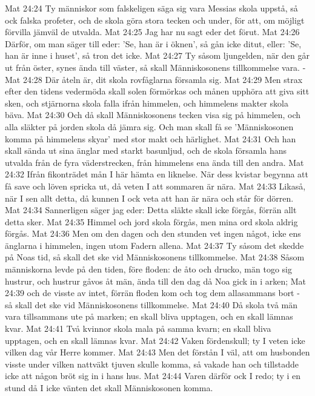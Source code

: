 Mat 24:24  Ty människor som falskeligen säga sig vara Messias skola uppstå, så ock falska profeter, och de skola göra stora tecken och under, för att, om möjligt förvilla jämväl de utvalda.
Mat 24:25  Jag har nu sagt eder det förut.
Mat 24:26  Därför, om man säger till eder: 'Se, han är i öknen', så gån icke ditut, eller: 'Se, han är inne i huset', så tron det icke.
Mat 24:27  Ty såsom ljungelden, när den går ut från öster, synes ända till väster, så skall Människosonens tillkommelse vara. -
Mat 24:28  Där åteln är, dit skola rovfåglarna församla sig.
Mat 24:29  Men strax efter den tidens vedermöda skall solen förmörkas och månen upphöra att giva sitt sken, och stjärnorna skola falla ifrån himmelen, och himmelens makter skola bäva.
Mat 24:30  Och då skall Människosonens tecken visa sig på himmelen, och alla släkter på jorden skola då jämra sig. Och man skall få se 'Människosonen komma på himmelens skyar' med stor makt och härlighet.
Mat 24:31  Och han skall sända ut sina änglar med starkt basunljud, och de skola församla hans utvalda från de fyra väderstrecken, från himmelens ena ända till den andra.
Mat 24:32  Ifrån fikonträdet mån I här hämta en liknelse. När dess kvistar begynna att få save och löven spricka ut, då veten I att sommaren är nära.
Mat 24:33  Likaså, när I sen allt detta, då kunnen I ock veta att han är nära och står för dörren.
Mat 24:34  Sannerligen säger jag eder: Detta släkte skall icke förgås, förrän allt detta sker.
Mat 24:35  Himmel och jord skola förgås, men mina ord skola aldrig förgås.
Mat 24:36  Men om den dagen och den stunden vet ingen något, icke ens änglarna i himmelen, ingen utom Fadern allena.
Mat 24:37  Ty såsom det skedde på Noas tid, så skall det ske vid Människosonens tillkommelse.
Mat 24:38  Såsom människorna levde på den tiden, före floden: de åto och drucko, män togo sig hustrur, och hustrur gåvos åt män, ända till den dag då Noa gick in i arken;
Mat 24:39  och de visste av intet, förrän floden kom och tog dem allasammans bort - så skall det ske vid Människosonens tillkommelse.
Mat 24:40  Då skola två män vara tillsammans ute på marken; en skall bliva upptagen, och en skall lämnas kvar.
Mat 24:41  Två kvinnor skola mala på samma kvarn; en skall bliva upptagen, och en skall lämnas kvar.
Mat 24:42  Vaken fördenskull; ty I veten icke vilken dag vår Herre kommer.
Mat 24:43  Men det förstån I väl, att om husbonden visste under vilken nattväkt tjuven skulle komma, så vakade han och tillstadde icke att någon bröt sig in i hans hus.
Mat 24:44  Varen därför ock I redo; ty i en stund då I icke vänten det skall Människosonen komma.
